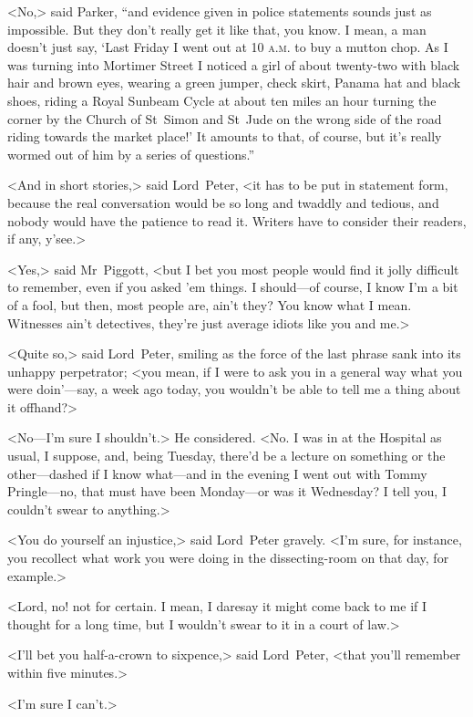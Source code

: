 <No,> said Parker, \enquote{and evidence given in police statements sounds just as impossible. But they don't really get it like that, you know. I mean, a man doesn't just say, \enquote{Last Friday I went out at 10 \textsc{a.m.} to buy a mutton chop. As I was turning into Mortimer Street I noticed a girl of about twenty-two with black hair and brown eyes, wearing a green jumper, check skirt, Panama hat and black shoes, riding a Royal Sunbeam Cycle at about ten miles an hour turning the corner by the Church of St~Simon and St~Jude on the wrong side of the road riding towards the market place!} It amounts to that, of course, but it's really wormed out of him by a series of questions.}

<And in short stories,> said Lord~Peter, <it has to be put in statement form, because the real conversation would be so long and twaddly and tedious, and nobody would have the patience to read it. Writers have to consider their readers, if any, y'see.>

<Yes,> said Mr~Piggott, <but I bet you most people would find it jolly difficult to remember, even if you asked 'em things. I should—of course, I know I'm a bit of a fool, but then, most people are, ain't they? You know what I mean. Witnesses ain't detectives, they're just average idiots like you and me.>

<Quite so,> said Lord~Peter, smiling as the force of the last phrase sank into its unhappy perpetrator; <you mean, if I were to ask you in a general way what you were doin'—say, a week ago today, you wouldn't be able to tell me a thing about it offhand?>

<No—I'm sure I shouldn't.> He considered. <No. I was in at the Hospital as usual, I suppose, and, being Tuesday, there'd be a lecture on something or the other—dashed if I know what—and in the evening I went out with Tommy Pringle—no, that must have been Monday—or was it Wednesday? I tell you, I couldn't swear to anything.>

<You do yourself an injustice,> said Lord~Peter gravely. <I'm sure, for instance, you recollect what work you were doing in the dissecting-room on that day, for example.>

<Lord, no! not for certain. I mean, I daresay it might come back to me if I thought for a long time, but I wouldn't swear to it in a court of law.>

<I'll bet you half-a-crown to sixpence,> said Lord~Peter, <that you'll remember within five minutes.>

<I'm sure I can't.>

